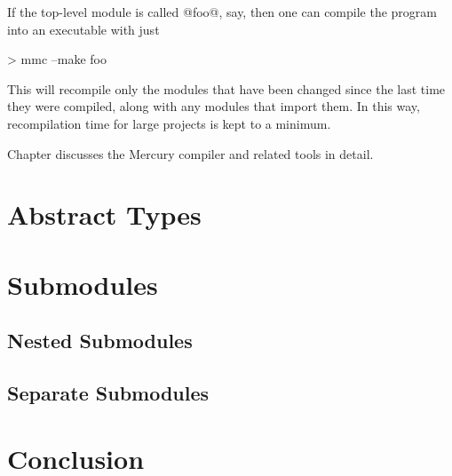 If the top-level module is called @foo@, say, then one can compile the
program into an executable with just
\begin{myverbatim}
> mmc --make foo
\end{myverbatim}
This will recompile only the modules that have been changed since the
last time they were compiled, along with any modules that import them.
In this way, recompilation time for large projects is kept to a minimum.

Chapter \XXX{} discusses the Mercury compiler and related tools in
detail.



\section{Abstract Types}



\section{Submodules}



\subsection{Nested Submodules}



\subsection{Separate Submodules}



\section{Conclusion}
